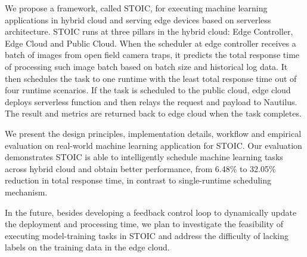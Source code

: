 We propose a framework, called STOIC, for executing machine learning applications in hybrid cloud and serving edge devices based on serverless architecture. STOIC runs at three pillars in the hybrid cloud: Edge Controller, Edge Cloud and Public Cloud. When the scheduler at edge controller receives a batch of images from open field camera traps, it predicts the total response time of processing such image batch based on batch size and historical log data. It then schedules the task to one runtime with the least total response time out of four runtime scenarios. If the task is scheduled to the public cloud, edge cloud deploys serverless function and then relays the request and payload to Nautilus. The result and metrics are returned back to edge cloud when the task completes.

We present the design principles, implementation details, workflow and empirical evaluation on real-world machine learning application for STOIC. Our evaluation demonstrates STOIC is able to intelligently schedule machine learning tasks across hybrid cloud and obtain better performance, from 6.48\% to 32.05\% reduction in total response time, in contrast to single-runtime scheduling mechanism.

In the future, besides developing a feedback control loop to dynamically update the deployment and processing time, we plan to investigate the feasibility of executing model-training tasks in STOIC and address the difficulty of lacking labels on the training data in the edge cloud.